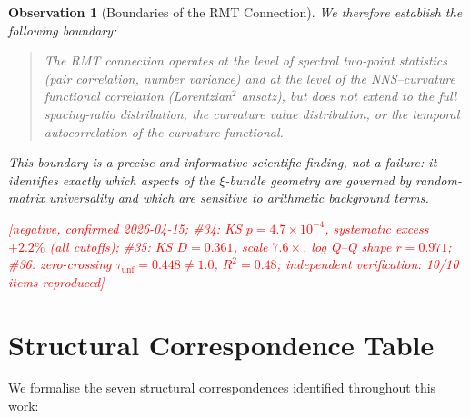 \documentclass[11pt, a4paper]{article}
\theoremstyle{definition}
\theoremstyle{plain}
\newtheorem{observation}[theorem]{Observation}
\begin{document}
\begin{observation}[Boundaries of the RMT Connection]
We therefore establish the following boundary:
\begin{quotation}\noindent
  \emph{The RMT connection operates at the level of spectral two-point
  statistics (pair correlation, number variance) and at the level of the
  NNS--curvature functional correlation (Lorentzian$^2$ ansatz), but
  does not extend to the full spacing-ratio distribution, the curvature
  value distribution, or the temporal autocorrelation of the curvature
  functional.}
\end{quotation}
This boundary is a precise and informative scientific finding, not a
failure: it identifies exactly which aspects of the $\xi$-bundle geometry
are governed by random-matrix universality and which are sensitive to
arithmetic background terms.

\textcolor{red}{[negative, confirmed 2026-04-15;
\#34: KS $p = 4.7\times10^{-4}$, systematic excess $+2.2\%$ (all cutoffs);
\#35: KS $D = 0.361$, scale $7.6\times$, log Q--Q shape $r = 0.971$;
\#36: zero-crossing $\tau_\text{unf} = 0.448 \neq 1.0$, $R^2 = 0.48$;
independent verification: 10/10 items reproduced]}
\end{observation}


\section{Structural Correspondence Table}
\label{sec:correspondence}

We formalise the seven structural correspondences identified throughout
this work:
\end{document}

